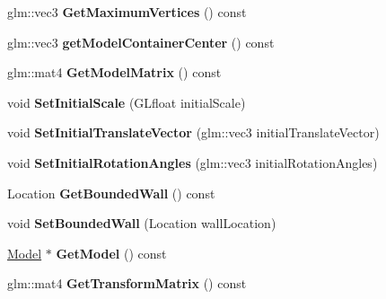 \begin{DoxyCompactItemize}
\item 
\hypertarget{class_model_container_af5b5265648933d3effb2e75c69412290}{}glm\+::vec3 {\bfseries Get\+Maximum\+Vertices} () const \label{class_model_container_af5b5265648933d3effb2e75c69412290}

\item 
\hypertarget{class_model_container_ac842121f3683631e63d232784841b1ea}{}glm\+::vec3 {\bfseries get\+Model\+Container\+Center} () const \label{class_model_container_ac842121f3683631e63d232784841b1ea}

\item 
\hypertarget{class_model_container_a277b409fafa9f2e51eca3ceaf05842b5}{}glm\+::mat4 {\bfseries Get\+Model\+Matrix} () const \label{class_model_container_a277b409fafa9f2e51eca3ceaf05842b5}

\item 
\hypertarget{class_model_container_adf273cf3b683f5f5452414d473afe2cb}{}void {\bfseries Set\+Initial\+Scale} (G\+Lfloat initial\+Scale)\label{class_model_container_adf273cf3b683f5f5452414d473afe2cb}

\item 
\hypertarget{class_model_container_a1ca63a7256501991de59f33452a20aae}{}void {\bfseries Set\+Initial\+Translate\+Vector} (glm\+::vec3 initial\+Translate\+Vector)\label{class_model_container_a1ca63a7256501991de59f33452a20aae}

\item 
\hypertarget{class_model_container_a29ae098cea587ffbd6595427045971b3}{}void {\bfseries Set\+Initial\+Rotation\+Angles} (glm\+::vec3 initial\+Rotation\+Angles)\label{class_model_container_a29ae098cea587ffbd6595427045971b3}

\item 
\hypertarget{class_model_container_a75175aeab083d162034b357205270759}{}Location {\bfseries Get\+Bounded\+Wall} () const \label{class_model_container_a75175aeab083d162034b357205270759}

\item 
\hypertarget{class_model_container_ae38be381c9c05dd5b6d505d1830d4264}{}void {\bfseries Set\+Bounded\+Wall} (Location wall\+Location)\label{class_model_container_ae38be381c9c05dd5b6d505d1830d4264}

\item 
\hypertarget{class_model_container_a0163bcb5b8ff80f52cfb043ec0f3aa63}{}\hyperlink{class_model}{Model} $\ast$ {\bfseries Get\+Model} () const \label{class_model_container_a0163bcb5b8ff80f52cfb043ec0f3aa63}

\item 
\hypertarget{class_model_container_a9df86e06bcda6af814008c136b1023e8}{}glm\+::mat4 {\bfseries Get\+Transform\+Matrix} () const \label{class_model_container_a9df86e06bcda6af814008c136b1023e8}


\end{DoxyCompactItemize}
